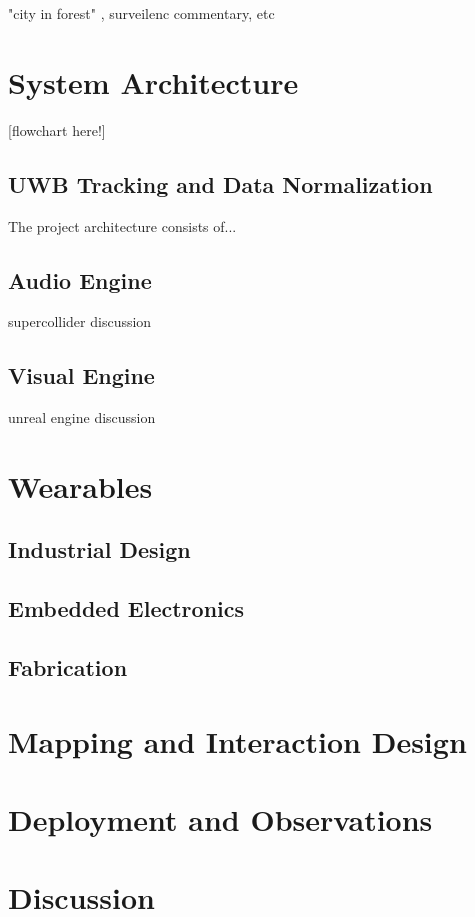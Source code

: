 \documentclass[sigconf]{nimeart}
\begin{document}
"city in forest" , surveilenc commentary, etc

\section{System Architecture}

[flowchart here!]

\subsection{UWB Tracking and Data Normalization}
The project architecture consists of... 

\subsection{Audio Engine}
supercollider discussion

\subsection{Visual Engine}
unreal engine discussion

\section{Wearables}

\subsection{Industrial Design}

\subsection{Embedded Electronics}

\subsection{Fabrication}

\section{Mapping and Interaction Design}

\section{Deployment and Observations}

\section{Discussion}
\end{document}
